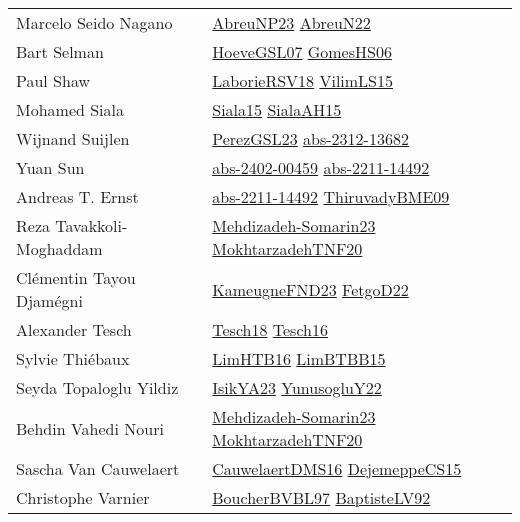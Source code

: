{\begin{longtable}{p{4cm}p{20cm}}
Marcelo Seido Nagano & \href{}{AbreuNP23}\cite{AbreuNP23} \href{articles/AbreuN22.pdf}{AbreuN22}\cite{AbreuN22} \\
Bart Selman & \href{papers/HoeveGSL07.pdf}{HoeveGSL07}\cite{HoeveGSL07} \href{papers/GomesHS06.pdf}{GomesHS06}\cite{GomesHS06} \\
Paul Shaw & \href{articles/LaborieRSV18.pdf}{LaborieRSV18}\cite{LaborieRSV18} \href{papers/VilimLS15.pdf}{VilimLS15}\cite{VilimLS15} \\
Mohamed Siala & \href{articles/Siala15.pdf}{Siala15}\cite{Siala15} \href{papers/SialaAH15.pdf}{SialaAH15}\cite{SialaAH15} \\
Wijnand Suijlen & \href{papers/PerezGSL23.pdf}{PerezGSL23}\cite{PerezGSL23} \href{articles/abs-2312-13682.pdf}{abs-2312-13682}\cite{abs-2312-13682} \\
Yuan Sun & \href{articles/abs-2402-00459.pdf}{abs-2402-00459}\cite{abs-2402-00459} \href{articles/abs-2211-14492.pdf}{abs-2211-14492}\cite{abs-2211-14492} \\
Andreas T. Ernst & \href{articles/abs-2211-14492.pdf}{abs-2211-14492}\cite{abs-2211-14492} \href{papers/ThiruvadyBME09.pdf}{ThiruvadyBME09}\cite{ThiruvadyBME09} \\
Reza Tavakkoli{-}Moghaddam & \href{papers/Mehdizadeh-Somarin23.pdf}{Mehdizadeh-Somarin23}\cite{Mehdizadeh-Somarin23} \href{}{MokhtarzadehTNF20}\cite{MokhtarzadehTNF20} \\
Cl{\'{e}}mentin Tayou Djam{\'{e}}gni & \href{papers/KameugneFND23.pdf}{KameugneFND23}\cite{KameugneFND23} \href{articles/FetgoD22.pdf}{FetgoD22}\cite{FetgoD22} \\
Alexander Tesch & \href{papers/Tesch18.pdf}{Tesch18}\cite{Tesch18} \href{papers/Tesch16.pdf}{Tesch16}\cite{Tesch16} \\
Sylvie Thi{\'{e}}baux & \href{papers/LimHTB16.pdf}{LimHTB16}\cite{LimHTB16} \href{papers/LimBTBB15.pdf}{LimBTBB15}\cite{LimBTBB15} \\
Seyda Topaloglu Yildiz & \href{articles/IsikYA23.pdf}{IsikYA23}\cite{IsikYA23} \href{}{YunusogluY22}\cite{YunusogluY22} \\
Behdin Vahedi Nouri & \href{papers/Mehdizadeh-Somarin23.pdf}{Mehdizadeh-Somarin23}\cite{Mehdizadeh-Somarin23} \href{}{MokhtarzadehTNF20}\cite{MokhtarzadehTNF20} \\
Sascha Van Cauwelaert & \href{papers/CauwelaertDMS16.pdf}{CauwelaertDMS16}\cite{CauwelaertDMS16} \href{papers/DejemeppeCS15.pdf}{DejemeppeCS15}\cite{DejemeppeCS15} \\
Christophe Varnier & \href{}{BoucherBVBL97}\cite{BoucherBVBL97} \href{papers/BaptisteLV92.pdf}{BaptisteLV92}\cite{BaptisteLV92} \\

\end{longtable}}
